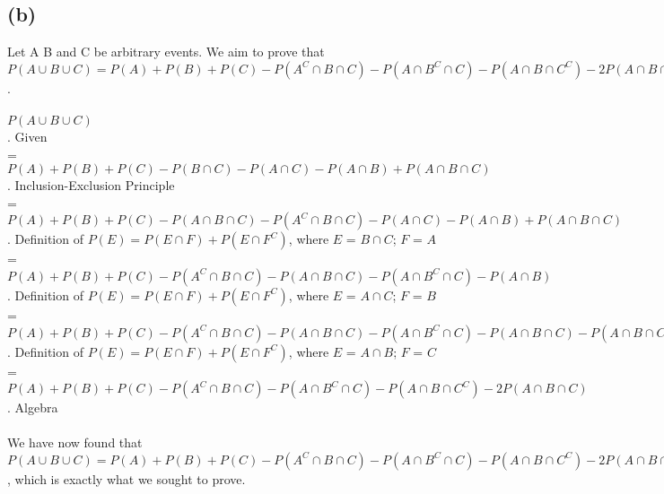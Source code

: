 \documentclass{article}
\begin{document}
{\subsection*{(b)}
Let A B and C be arbitrary events. We aim to prove that \\ 
$P(A \cup B \cup C) = P(A) + P(B) + P(C) - P(A^C \cap B \cap C) - P(A \cap B^C \cap C) - P(A \cap B \cap C^C) - 2P(A \cap B \cap C)$. \\ \\ 
$P(A \cup B \cup C)$ \\ . \hfill Given\\ 
= $P(A) + P(B) + P(C) - P(B \cap C) - P(A \cap C) - P(A \cap B) + P(A \cap B \cap C)$ \\ . \hfill Inclusion-Exclusion Principle\\ 
= $P(A) + P(B) + P(C) - P(A \cap B \cap C) - P(A^C \cap B \cap C)  - P(A \cap C) - P(A \cap B) + P(A \cap B \cap C)$ \\ . \hfill Definition of $P(E) = P(E \cap F) + P(E \cap F^C)$, where $E$ = $B \cap C$; $F$ = $A$\\ 
= $P(A) + P(B) + P(C) - P(A^C \cap B \cap C) - P(A \cap B \cap C) - P(A \cap B^C \cap C) - P(A \cap B)$ \\ . \hfill Definition of $P(E) = P(E \cap F) + P(E \cap F^C)$, where $E$ = $A \cap C$; $F$ = $B$\\ 
= $P(A) + P(B) + P(C) - P(A^C \cap B \cap C) - P(A \cap B \cap C) - P(A \cap B^C \cap C) - P(A \cap B \cap C) - P(A \cap B \cap C^C)$ \\ . \hfill Definition of $P(E) = P(E \cap F) + P(E \cap F^C)$, where $E$ = $A \cap B$; $F$ = $C$\\ 
= $P(A) + P(B) + P(C) - P(A^C \cap B \cap C) - P(A \cap B^C \cap C) - P(A \cap B \cap C^C) - 2P(A \cap B \cap C) $ . \hfill Algebra\\ \\
We have now found that $P(A \cup B \cup C) = P(A) + P(B) + P(C) - P(A^C \cap B \cap C) - P(A \cap B^C \cap C) - P(A \cap B \cap C^C) - 2P(A \cap B \cap C)$, which is exactly what we sought to prove.


}
\end{document}
